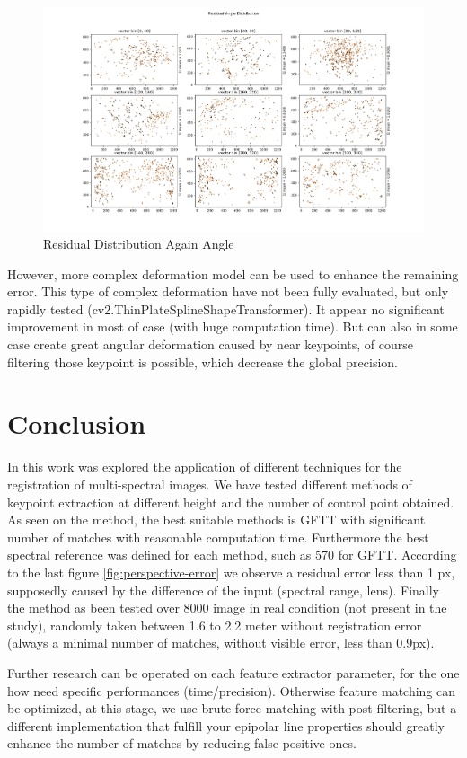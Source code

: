 \documentclass[]{elsarticle}
\begin{document}
	\begin{figure}[!htb]
		\centering
		\includegraphics[width=\linewidth]{../figures/perspective-features-residual.png}
		\caption{Residual Distribution Again Angle}
		\label{fig:residual-angle}
	\end{figure}
	
	However, more complex deformation model \cite{10.1007/978-3-642-33709-3_3} can be used to enhance the remaining error.
	This type of complex deformation have not been fully evaluated, but only rapidly tested (cv2.ThinPlateSplineShapeTransformer).
	It appear no significant improvement in most of case (with huge computation time).
	But can also in some case create great angular deformation caused by near keypoints,
	of course filtering those keypoint is possible, which decrease the global precision.
	
	
	\section{Conclusion}
	
	In this work was explored the application of different techniques for the registration of multi-spectral images.
	We have tested different methods of keypoint extraction at different height and the number of control point obtained.
	As seen on the method, the best suitable methods is GFTT with significant number of matches with reasonable computation time.
	Furthermore the best spectral reference was defined for each method, such as 570 for GFTT.
	According to the last figure \ref{fig:perspective-error} we observe a residual error less than 1 px,
	supposedly caused by the difference of the input (spectral range, lens).
	Finally the method as been tested over 8000 image in real condition (not present in the study),
	randomly taken between 1.6 to 2.2 meter without registration error (always a minimal number of matches, without visible error, less than $0.9$px).
	\\
	\par Further research can be operated on each feature extractor parameter, for the one how need specific performances (time/precision).
	Otherwise feature matching can be optimized, at this stage, we use brute-force matching with post filtering,
	but a different implementation that fulfill your epipolar line properties should greatly enhance the number of matches by reducing false positive ones.
	
\end{document}
